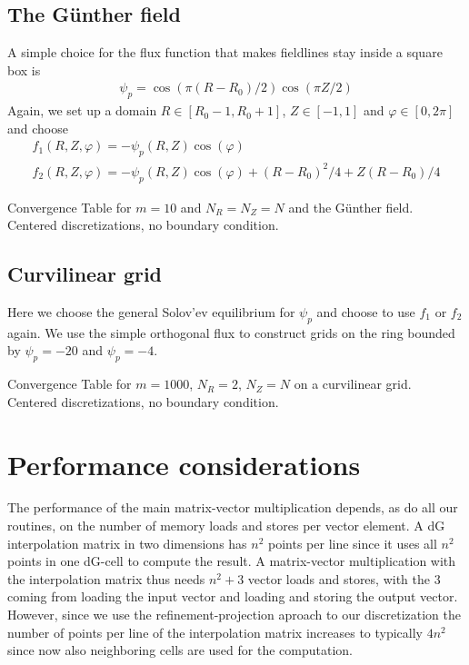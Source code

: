 \subsection{The G\"unther field}
A simple choice for the flux function that makes fieldlines stay
inside a square box is
\begin{align}
  \psi_p = \cos(\pi (R-R_0)/2) \cos(\pi Z /2)
\label{}
\end{align}
Again, we set up a domain
$R\in[R_0-1, R_0+1]$,
$Z\in[-1,1]$ and
$\varphi \in [0,2\pi]$ and choose
\begin{align}
  f_1(R,Z,\varphi) = -\psi_p(R,Z)\cos(\varphi)\\
  f_2(R,Z,\varphi) = -\psi_p(R,Z)\cos(\varphi) + (R-R_0)^2/4 + Z(R-R_0)/4
  \label{}
\end{align}
\begin{table*}[ht]
\begin{centering}
\footnotesize
\hspace*{-2cm}

\caption{Convergence Table for $m=10$ and $N_R=N_Z=N$ and the G\"unther field. Centered discretizations, no boundary condition.
}
\label{tab:ds_guenther10}
\end{centering}
\end{table*}
\subsection{Curvilinear grid}
Here we choose the general Solov'ev equilibrium for
$\psi_p$ and choose to use $f_1$ or $f_2$ again.
We use the simple orthogonal flux to construct
grids on the ring bounded by $\psi_p=-20$ and $\psi_p=-4$.
\begin{table*}[ht]
\begin{centering}
\footnotesize
\hspace*{-2cm}

\caption{Convergence Table for $m=1000$, $N_R = 2$, $N_Z=N$ on a curvilinear grid. Centered discretizations, no boundary condition.
}
\label{tab:ds_curv1000}
\end{centering}
\end{table*}
\section{Performance considerations}
The performance of the main matrix-vector multiplication depends, as do all our
routines, on the number of memory loads and stores per vector element.
A dG interpolation matrix in two dimensions has $n^2$ points per line since
it uses all $n^2$ points in one dG-cell to compute the result.
A matrix-vector multiplication with the interpolation matrix thus needs $n^2+3$
vector loads and stores, with the $3$ coming from loading the input vector and
loading and storing the output vector.
However, since we use the refinement-projection aproach to our discretization
the number of points per line of the interpolation matrix increases to typically
$4n^2$ since now also neighboring cells are used for the computation.

